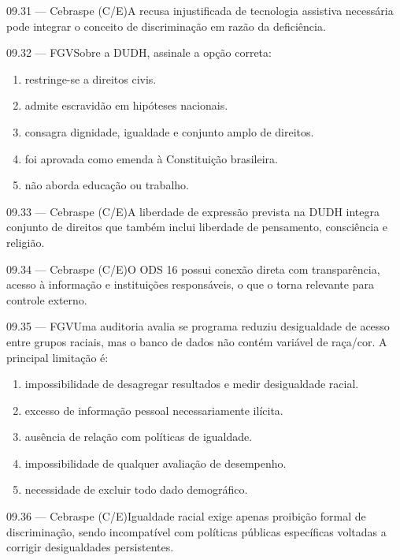 \begin{questao}{ 09.31 — Cebraspe (C/E)}A recusa injustificada de tecnologia assistiva necessária pode integrar o conceito de discriminação em razão da deficiência.\end{questao}
\begin{questao}{ 09.32 — FGV}Sobre a DUDH, assinale a opção correta:\begin{enumerate}[label=\Alph*)]\item restringe-se a direitos civis.\item admite escravidão em hipóteses nacionais.\item consagra dignidade, igualdade e conjunto amplo de direitos.\item foi aprovada como emenda à Constituição brasileira.\item não aborda educação ou trabalho.\end{enumerate}\end{questao}
\begin{questao}{ 09.33 — Cebraspe (C/E)}A liberdade de expressão prevista na DUDH integra conjunto de direitos que também inclui liberdade de pensamento, consciência e religião.\end{questao}
\begin{questao}{ 09.34 — Cebraspe (C/E)}O ODS 16 possui conexão direta com transparência, acesso à informação e instituições responsáveis, o que o torna relevante para controle externo.\end{questao}
\begin{questao}{ 09.35 — FGV}Uma auditoria avalia se programa reduziu desigualdade de acesso entre grupos raciais, mas o banco de dados não contém variável de raça/cor. A principal limitação é:\begin{enumerate}[label=\Alph*)]\item impossibilidade de desagregar resultados e medir desigualdade racial.\item excesso de informação pessoal necessariamente ilícita.\item ausência de relação com políticas de igualdade.\item impossibilidade de qualquer avaliação de desempenho.\item necessidade de excluir todo dado demográfico.\end{enumerate}\end{questao}
\begin{questao}{ 09.36 — Cebraspe (C/E)}Igualdade racial exige apenas proibição formal de discriminação, sendo incompatível com políticas públicas específicas voltadas a corrigir desigualdades persistentes.\end{questao}
